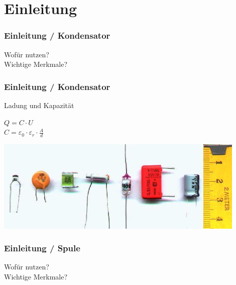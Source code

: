 

\subtitle{Technik Klasse A 03: \\
  Kondensator, Spule, Transformator \\[2em]}
\date{Stand 11.01.2016}


\section*{Einleitung}

\begin{frame}
  \frametitle{Einleitung / Kondensator}
  \begin{center}
    \Large{Wofür nutzen?}\\
    \Large{Wichtige Merkmale?}
  \end{center}
\end{frame}

\begin{frame}
  \frametitle{Einleitung / Kondensator}
  \begin{block}{Ladung und Kapazität}
    \begin{center}
      \Large{$Q = C \cdot U$}\\
      \Large{$C= \varepsilon_{0} \cdot \varepsilon_{r} \cdot \frac{A}{d}$}
    \end{center}
  \end{block}
  \begin{center}
    \includegraphics[width=0.9\textwidth,height=0.6\textheight,keepaspectratio]{e05/Kondensator02.jpg}
    \tiny \hyperlink{refs}{\cite{wc}}
  \end{center}
\end{frame}


\begin{frame}
  \frametitle{Einleitung / Spule}
  \begin{center}
    \Large{Wofür nutzen?}\\
    \Large{Wichtige Merkmale?}
  \end{center}
\end{frame}


